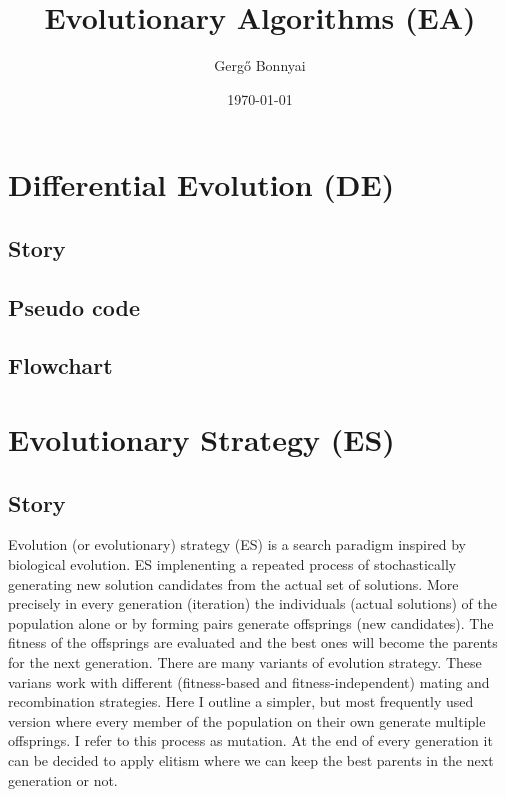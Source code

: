 \documentclass[border=0.2cm]{report}
\title{Evolutionary Algorithms (EA)}
\author{Gergő Bonnyai}
\date{\today}
\begin{document}
\maketitle

\tableofcontents
\listoffigures

\clearpage

\chapter{Differential Evolution (DE)}
\section{Story}
\section{Pseudo code}
\section{Flowchart}

\chapter{Evolutionary Strategy (ES)}
\section{Story}

Evolution (or evolutionary) strategy (ES) \cite{es1, es2} is a search paradigm inspired by biological evolution. ES implenenting a repeated process of stochastically generating new solution candidates from the actual set of solutions. More precisely in every generation (iteration) the individuals (actual solutions) of the population alone or by forming pairs generate offsprings (new candidates). The fitness of the offsprings are evaluated and the best ones will become the parents for the next generation. There are many variants of evolution strategy. These varians work with different (fitness-based and fitness-independent) mating and recombination strategies. Here I outline a simpler, but most frequently used version where every member of the population on their own generate multiple offsprings. I refer to this process as mutation. At the end of every generation it can be decided to apply elitism where we can keep the best parents in the next generation or not. \\
\end{document}

